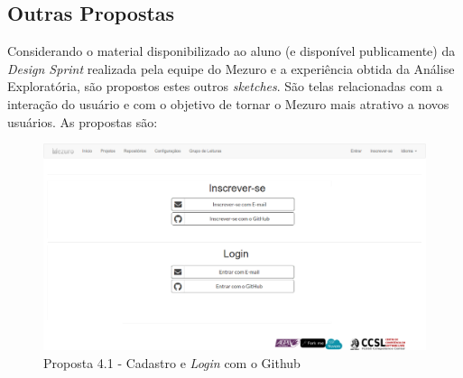 \subsection{Outras Propostas}

Considerando o material disponibilizado ao aluno (e disponível publicamente) da
\textit{Design Sprint} realizada pela equipe do Mezuro e a experiência obtida
da Análise Exploratória, são propostos estes outros \textit{sketches}. São telas
relacionadas com a interação do usuário e com o objetivo de tornar o Mezuro mais
atrativo a novos usuários. As propostas são:

\begin{figure}[!htb]
	\centering
    \includegraphics[keepaspectratio=true,scale=0.35]
    {figuras/mezuro-cadastro-github.eps}
  \caption{Proposta 4.1 - Cadastro e \textit{Login} com o Github}
  \label{fig:mezuro-cadastro-github}
\end{figure}

